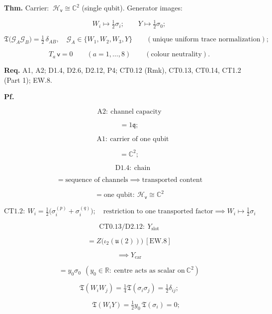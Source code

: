 \begin{theorem}\label{tag:EW-32}
\textbf{Thm.} Carrier: $\ \mathcal H_{\mathsf v}\cong\mathbb C^2$ (single qubit). Generator images:

\[
W_i\longmapsto\tfrac12\sigma_i;\qquad Y\longmapsto\tfrac12\sigma_0 ;
\]

\[
\mathfrak T\bigl(\mathcal G_A\mathcal G_B\bigr)=\tfrac12\,\delta_{AB},\quad\mathcal G_A\in\{W_1,W_2,W_3,Y\}\qquad(\text{unique uniform trace normalization});
\]

\[
T_a\,\mathsf v=0\qquad(a=1,\dots,8)\qquad(\text{colour neutrality}).
\]

\textbf{Req.} A1, A2; D1.4, D2.6, D2.12, P4; CT0.12 (Rmk), CT0.13, CT0.14, CT1.2 (Part 1); EW.8.

\textbf{Pf.}

\[
\mathrm{A2}:\ \text{channel capacity}
\]

\[
= 1\mathfrak q;
\]

\[
\quad\mathrm{A1}:\ \text{carrier of one qubit}
\]

\[
= \mathbb C^2;
\]

\[
\quad\mathrm{D1.4}:\ \text{chain}
\]

\[
= \text{sequence of channels}\implies\text{transported content}
\]

\[
= \text{one qubit}:\ \mathcal H_{\mathsf v}\cong\mathbb C^2
\]

\[
\mathrm{CT1.2}:\ W_i=\tfrac12\bigl(\sigma_i^{(p)}+\sigma_i^{(q)}\bigr);\quad\text{restriction to one transported factor}\implies W_i\mapsto\tfrac12\sigma_i
\]

\[
\mathrm{CT0.13}/\mathrm{D2.12}:\ Y_{\mathrm{slot}}
\]

\[
= Z\bigl(\iota_2(\mathfrak u(2))\bigr)\ [\mathrm{EW.8}]
\]

\[
\implies Y_{\mathrm{car}}
\]

\[
= y_0\sigma_0\ \ (y_0\in\mathbb R:\ \text{centre acts as scalar on}\ \mathbb C^2)
\]

\[
\mathfrak T(W_iW_j)=\tfrac14\mathfrak T(\sigma_i\sigma_j)=\tfrac12\delta_{ij};
\]

\[
\qquad \mathfrak T(W_iY)=\tfrac12y_0\,\mathfrak T(\sigma_i)=0;
\]


\end{theorem}
